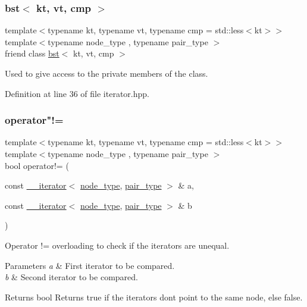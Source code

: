 \subsubsection{\texorpdfstring{bst$<$ kt, vt, cmp $>$}{bst< kt, vt, cmp >}}
{\footnotesize\ttfamily template$<$typename kt, typename vt, typename cmp = std\+::less$<$kt$>$$>$ \\
template$<$typename node\+\_\+type , typename pair\+\_\+type $>$ \\
friend class \hyperlink{classbst}{bst}$<$ kt, vt, cmp $>$\hspace{0.3cm}{\ttfamily [friend]}}

Used to give access to the private members of the class. 

Definition at line 36 of file iterator.\+hpp.

\mbox{\label{classbst_1_1____iterator_add0144e7693bde5e4b509b5fd8dc5c96}} 
\subsubsection{\texorpdfstring{operator"!=}{operator!=}}
{\footnotesize\ttfamily template$<$typename kt, typename vt, typename cmp = std\+::less$<$kt$>$$>$ \\
template$<$typename node\+\_\+type , typename pair\+\_\+type $>$ \\
bool operator!= (\begin{DoxyParamCaption}\item[{const \hyperlink{classbst_1_1____iterator}{\+\_\+\+\_\+iterator}$<$ \hyperlink{classbst_a062eb2a1ac54802dbc4f0f74ae2afd01}{node\+\_\+type}, \hyperlink{classbst_a7b11cca2a3b4394915600194f741ab16}{pair\+\_\+type} $>$ \&}]{a,  }\item[{const \hyperlink{classbst_1_1____iterator}{\+\_\+\+\_\+iterator}$<$ \hyperlink{classbst_a062eb2a1ac54802dbc4f0f74ae2afd01}{node\+\_\+type}, \hyperlink{classbst_a7b11cca2a3b4394915600194f741ab16}{pair\+\_\+type} $>$ \&}]{b }\end{DoxyParamCaption})\hspace{0.3cm}{\ttfamily [friend]}}



Operator != overloading to check if the iterators are unequal. 


\begin{DoxyParams}{Parameters}
{\em a} & First iterator to be compared. \\
\hline
{\em b} & Second iterator to be compared. \\
\hline
\end{DoxyParams}
\begin{DoxyReturn}{Returns}
bool Returns true if the iterators don\textquotesingle{}t point to the same node, else false. 
\end{DoxyReturn}


